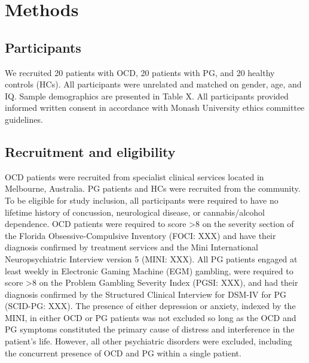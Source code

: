 \section{Methods}

\subsection{Participants}

We recruited 20 patients with OCD, 20 patients with PG, and 20 healthy controls (HCs). All participants were unrelated and matched on gender, age, and IQ. Sample demographics are presented in Table X. All participants provided informed written consent in accordance with Monash University ethics committee guidelines.

\subsection{Recruitment and eligibility}

OCD patients were recruited from specialist clinical services located in Melbourne, Australia. PG patients and HCs were recruited from the community. To be eligible for study inclusion, all participants were required to have no lifetime history of concussion, neurological disease, or cannabis/alcohol dependence. OCD patients were required to score >8 on the severity section of the Florida Obsessive-Compulsive Inventory (FOCI: XXX) and have their diagnosis confirmed by treatment services and the Mini International Neuropsychiatric Interview version 5 (MINI: XXX). All PG patients engaged at least weekly in Electronic Gaming Machine (EGM) gambling, were required to score >8 on the Problem Gambling Severity Index (PGSI: XXX), and had their diagnosis confirmed by the Structured Clinical Interview for DSM-IV for PG (SCID-PG: XXX). The presence of either depression or anxiety, indexed by the MINI, in either OCD or PG patients was not excluded so long as the OCD and PG symptoms constituted the primary cause of distress and interference in the patient’s life. However, all other psychiatric disorders were excluded, including the concurrent presence of OCD and PG within a single patient.